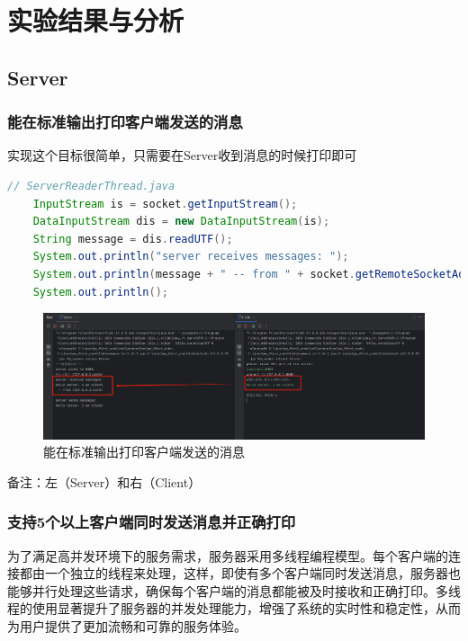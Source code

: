 \documentclass{article}
\begin{document}
	\section{实验结果与分析}
	
	\subsection{Server}
	
	\subsubsection{能在标准输出打印客户端发送的消息}
	
	实现这个目标很简单，只需要在Server收到消息的时候打印即可
	
	\begin{lstlisting}[language=Java, title=能在标准输出打印客户端发送的消息, tabsize=4]
	// ServerReaderThread.java
	InputStream is = socket.getInputStream();
	DataInputStream dis = new DataInputStream(is);
	String message = dis.readUTF();
	System.out.println("server receives messages: ");
	System.out.println(message + " -- from " + socket.getRemoteSocketAddress());
	System.out.println();
	\end{lstlisting}
	
	\begin{figure}[H]
		\centering
		\includegraphics[width=15cm]{./images/1.能在标准输出打印客户端发送的消息.png}
		\caption{能在标准输出打印客户端发送的消息}
	\end{figure}
	
	备注：左（Server）和右（Client）
	
	\subsubsection{支持5个以上客户端同时发送消息并正确打印}
	
	为了满足高并发环境下的服务需求，服务器采用多线程编程模型。每个客户端的连接都由一个独立的线程来处理，这样，即使有多个客户端同时发送消息，服务器也能够并行处理这些请求，确保每个客户端的消息都能被及时接收和正确打印。多线程的使用显著提升了服务器的并发处理能力，增强了系统的实时性和稳定性，从而为用户提供了更加流畅和可靠的服务体验。
	
\end{document}
